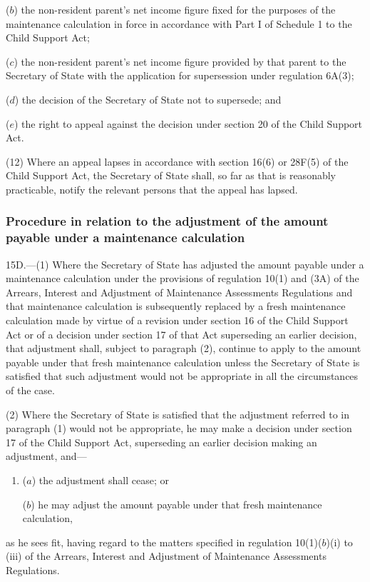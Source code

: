 \documentclass[12pt,a4paper]{article}
\begin{document}
{\begin{enumerate}
($b$) the non-resident parent’s net income figure fixed for the purposes of the maintenance calculation in force in accordance with Part I of Schedule 1 to the Child Support Act;

($c$) the non-resident parent’s net income figure provided by that parent to the Secretary of State with the application for supersession under regulation 6A(3);

($d$) the decision of the Secretary of State not to supersede; and

($e$) the right to appeal against the decision under section 20 of the Child Support Act.
\end{enumerate}

(12) Where an appeal lapses in accordance with section 16(6) or 28F(5) of the Child Support Act, the Secretary of State shall, so far as that is reasonably practicable, notify the relevant persons that the appeal has lapsed.


\subsubsection[15D. Procedure in relation to the adjustment of the amount payable under a maintenance calculation]{Procedure in relation to the adjustment of the amount payable under a maintenance calculation}

15D.---(1)  Where the Secretary of State has adjusted the amount payable under a maintenance calculation under the provisions of regulation 10(1) and (3A) of the Arrears, Interest and Adjustment of Maintenance Assessments Regulations and that maintenance calculation is subsequently replaced by a fresh maintenance calculation made by virtue of a revision under section 16 of the Child Support Act or of a decision under section 17 of that Act superseding an earlier decision, that adjustment shall, subject to paragraph (2), continue to apply to the amount payable under that fresh maintenance calculation unless the Secretary of State is satisfied that such adjustment would not be appropriate in all the circumstances of the case.

(2) Where the Secretary of State is satisfied that the adjustment referred to in paragraph (1) would not be appropriate, he may make a decision under section 17 of the Child Support Act, superseding an earlier decision making an adjustment, and—
\begin{enumerate}\item[]
($a$) the adjustment shall cease; or

($b$) he may adjust the amount payable under that fresh maintenance calculation,
\end{enumerate}
as he sees fit, having regard to the matters specified in regulation 10(1)($b$)(i)  to (iii)  of the Arrears, Interest and Adjustment of Maintenance Assessments Regulations.

}
\end{document}
